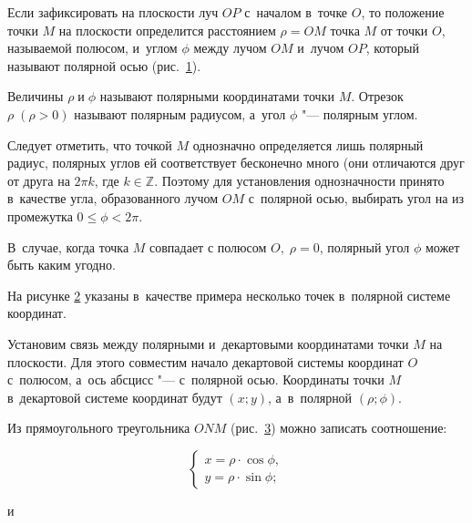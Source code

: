 Если зафиксировать на плоскости луч $OP$ с~началом в~точке $O$,
то положение точки $M$ на плоскости определится расстоянием $\rho = OM$
точка $M$ от точки $O$, называемой полюсом, и~углом $\phi$ между
лучом $OM$ и~лучом $OP$, который называют полярной осью (рис.\ \ref{fig_14_1}).

\begin{figure}\label{fig_14_1}
\end{figure}

Величины $\rho \; \text{и} \; \phi$ называют полярными координатами точки $M$.
Отрезок $\rho \; (\rho > 0)$ называют полярным радиусом,
а~угол $\phi$ "--- полярным углом.

Следует отметить, что точкой $M$ однозначно определяется лишь полярный радиус,
полярных углов ей соответствует бесконечно много (они отличаются друг от друга
на $2\pi k$, где $k \in \mathbb{Z}$.
Поэтому для установления однозначности принято в~качестве угла,
образованного лучом $OM$ с~полярной осью, выбирать угол на из промежутка
$0 \leqslant \phi < 2\pi$.

В~случае, когда точка $M$ совпадает с полюсом $O, \; \rho =  0$,
полярный угол $\phi$ может быть каким угодно.

На рисунке \ref{fig_14_2} указаны в~качестве примера несколько точек
в~полярной системе координат.

\begin{figure}\label{fig_14_2}
\end{figure}

Установим связь между полярными и~декартовыми координатами точки $M$
на плоскости. Для этого совместим начало декартовой системы координат $O$
с~полюсом, а~ось абсцисс "--- с~полярной осью.
Координаты точки $M$ в~декартовой системе координат будут $(x; y)$,
а~в~полярной $(\rho; \phi)$.

Из прямоугольного треугольника $O N M$ (рис.\ \ref{fig_14_3}) можно записать соотношение:

\begin{figure}\label{fig_14_3}
\end{figure}

\begin{equation}\label{eq_14_1}
\begin{cases}
x = \rho \cdot \cos \phi, \\
y = \rho \cdot \sin \phi;
\end{cases}
\end{equation}

и

